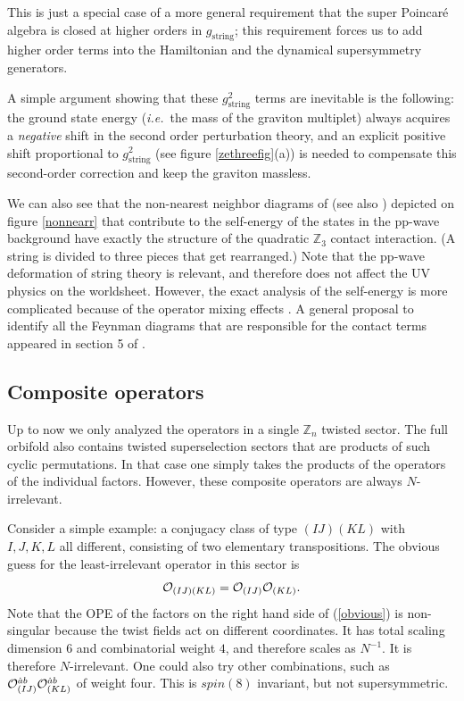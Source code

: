 \documentclass[nohyper,12pt,letterpaper]{JHEP3}
\def\IZ{{\mathbb Z}}           %
\def\calO{{\cal O}}
\def \eqref#1{(\ref{#1})}
\def \eqn#1#2{\begin{equation}#2\label{#1}\end{equation}}
\def \gs{g_{\mathrm{string}}}
\begin{document}

This is just a special case of a more general requirement that the super 
Poincar\'{e} algebra is closed at higher orders in $\gs$; this requirement 
forces us to add higher order terms into the Hamiltonian and the dynamical 
supersymmetry generators.

A simple argument showing that these $\gs^2$ terms are inevitable is
the following: the ground state energy ({\it i.e.}\ the mass of the graviton
multiplet) always acquires a {\it negative} shift in the second order
perturbation theory, and an explicit positive shift proportional to
$\gs^2$ (see figure \ref{zethreefig}(a)) is needed to compensate this
second-order correction and keep the graviton massless.

We can also see that the non-nearest neighbor diagrams of
\cite{constable} (see also \cite{staudacher}) depicted on figure
\ref{nonnearr} that contribute to the self-energy of the states in the
pp-wave background have exactly the structure of the quadratic $\IZ_3$
contact interaction. (A string is divided to three pieces that get
rearranged.)  Note that the pp-wave deformation of string theory is
relevant, and therefore does not affect the UV physics on the
worldsheet. However, the exact analysis of the self-energy is more
complicated because of the operator mixing effects
\cite{mixingboston,mixingreich,mixingqm,mixingdilat}.
A general proposal to identify all the Feynman diagrams that are 
responsible for the contact terms appeared in section 5 of 
\cite{umutcontact}.


\subsection{Composite operators}

Up to now we only analyzed the operators in a single $\IZ_n$ twisted 
sector. The full orbifold also contains twisted superselection sectors 
that are products of such cyclic permutations. In that case one simply 
takes the products of the operators of the individual factors. However, 
these composite operators are always $N$-irrelevant.

Consider a simple example: a conjugacy class of type $(IJ)(KL)$ with 
$I,J,K,L$ all different, consisting of two elementary transpositions. The 
obvious guess for the least-irrelevant operator in this sector is
%
\eqn{obvious}{\calO_{(IJ)(KL)}
=\calO_{(IJ)}\calO_{(KL)}.}
%
Note that the OPE of the factors on the right hand side of
\eqref{obvious} is non-singular because the twist fields act on
different coordinates. It has total scaling dimension $6$ and
combinatorial weight $4$, and therefore scales as $N^{-1}$. It is
therefore $N$-irrelevant. One could also try other combinations, such
as $\calO^{\dot a b}_{(IJ)} \calO_{(KL)}^{\dot a b}$ of weight
four. This is $spin(8)$ invariant, but not supersymmetric.
\end{document}
